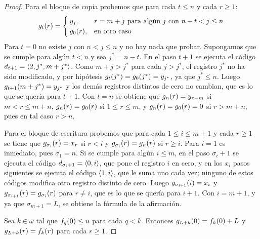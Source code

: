 \begin{agregado}
\begin{agregado}
\begin{correccion}
\begin{proof}
	Para el bloque de copia probemos que para cada $t\leq n$ y cada $r\geq 1$:
	\[
		g_{t}\pa*{r} =
		\begin{cases}
			y_{j}, & r = m + j\text{ para algún } j\text{ con } n - t < j\leq n\\
			g_{0}\pa*{r}, &\text{en otro caso}
		\end{cases}
	\]
	Para $t = 0$ no existe $j$ con $n < j\leq n$ y no hay nada que probar. Supongamos que se cumple para algún $t < n$ y sea $j^{*} = n - t$. En el paso $t + 1$ se ejecuta el código $d_{t + 1} =\inner*{2, j^{*}, m + j^{*}}$. Como $m + j > j^{*}$ para cada $j > j^{*}$, el registro $j^{*}$ no ha sido modificado, y por hipótesis $g_{t}\pa*{j^{*}} = g_{0}\pa*{j^{*}} = y_{j^{*}}$, ya que $j^{*}\leq n$. Luego $g_{t + 1}\pa*{m + j^{*}} = y_{j^{*}}$ y los demás registros distintos de cero no cambian, que es lo que se quería para $t + 1$. Con $t = n$ se obtiene que $g_{n}\pa*{r} = y_{r - m}$ si $m < r\leq m + n$, $g_{n}\pa*{r} = g_{0}\pa*{r}$ si $1\leq r\leq m$, y $g_{n}\pa*{r} = g_{0}\pa*{r} = 0$ si $r > m + n$, pues en tal caso $r > n$.

	Para el bloque de escritura probemos que para cada $1\leq i\leq m + 1$ y cada $r\geq 1$ se tiene que $g_{\sigma_{i}}\pa*{r} = x_{r}$ si $r < i$ y $g_{\sigma_{i}}\pa*{r} = g_{n}\pa*{r}$ si $r\geq i$. Para $i = 1$ es inmediato, pues $\sigma_{1} = n$. Si se cumple para algún $i\leq m$, en el paso $\sigma_{i} + 1$ se ejecuta el código $d_{\sigma_{i} + 1} =\inner*{0, i}$, que pone el registro $i$ en cero, y en los $x_{i}$ pasos siguientes se ejecuta el código $\inner*{1, i}$, que le suma uno cada vez; ninguno de estos códigos modifica otro registro distinto de cero. Luego $g_{\sigma_{i + 1}}\pa*{i} = x_{i}$ y $g_{\sigma_{i + 1}}\pa*{r} = g_{\sigma_{i}}\pa*{r}$ para $r\neq i$, que es lo que se quería para $i + 1$. Con $i = m + 1$, y ya que $\sigma_{m + 1} = L$, se obtiene la fórmula de la afirmación.

	Sea $k\in\omega$ tal que $f_{q}\pa*{0}\leq u$ para cada $q < k$. Entonces $g_{L + k}\pa*{0} = f_{k}\pa*{0} + L$ y $g_{L + k}\pa*{r} = f_{k}\pa*{r}$ para cada $r\geq 1$.


\end{proof}
\end{correccion}
\end{agregado}
\end{agregado}
